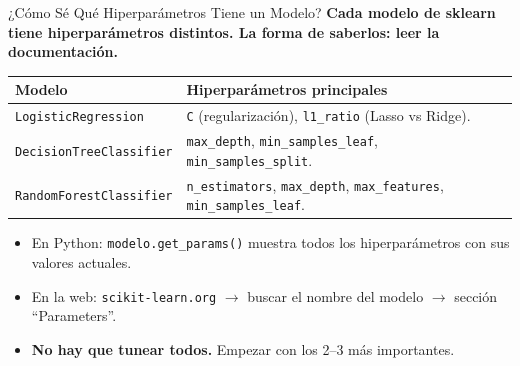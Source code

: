\documentclass[aspectratio=169, 11pt]{beamer}
\begin{document}
\begin{frame}{¿Cómo Sé Qué Hiperparámetros Tiene un Modelo?}
  \vspace{-4pt}
  {\footnotesize\color{arcaDark}\bfseries
    Cada modelo de sklearn tiene hiperparámetros distintos.
    La forma de saberlos: \textbf{leer la documentación}.}

  \vspace{6pt}
  {\scriptsize
  \begin{tabular}{@{}lp{8cm}@{}}
    \toprule
    \textbf{Modelo} & \textbf{Hiperparámetros principales} \\
    \midrule
    \texttt{LogisticRegression} & \texttt{C} (regularización), \texttt{l1\_ratio} (Lasso vs Ridge). \\
    \texttt{DecisionTreeClassifier} & \texttt{max\_depth}, \texttt{min\_samples\_leaf}, \texttt{min\_samples\_split}. \\
    \texttt{RandomForestClassifier} & \texttt{n\_estimators}, \texttt{max\_depth}, \texttt{max\_features}, \texttt{min\_samples\_leaf}. \\
    \bottomrule
  \end{tabular}
  }

  \vspace{6pt}
  {\footnotesize
  \begin{itemize}\setlength{\itemsep}{4pt}
    \item[{\color{arcaRed}\scriptsize\faArrowRight}]
      En Python: \texttt{modelo.get\_params()} muestra todos los
      hiperparámetros con sus valores actuales.
    \item[{\color{arcaRed}\scriptsize\faArrowRight}]
      En la web: \texttt{scikit-learn.org} $\to$ buscar el nombre del modelo
      $\to$ sección ``Parameters''.
    \item[{\color{codeGreen}\scriptsize\faArrowRight}]
      \textbf{No hay que tunear todos.} Empezar con los 2--3 más importantes.
  \end{itemize}
  }
\end{frame}
\end{document}
